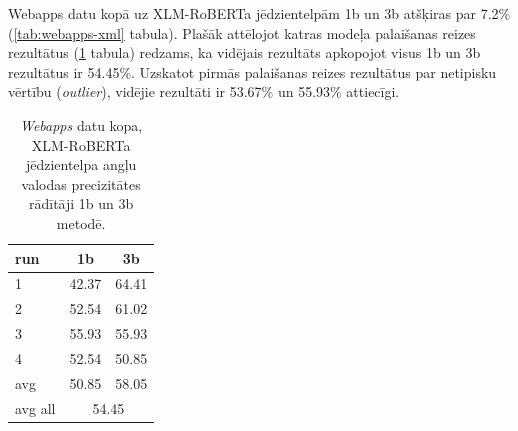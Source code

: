 Webapps datu kopā uz XLM-RoBERTa jēdzientelpām 1b un 3b atšķiras par 
7.2\% (\ref{tab:webapps-xml} tabula). Plašāk attēlojot katras modeļa palaišanas reizes rezultātus (\ref{tab:13b-webapps} tabula) redzams, ka vidējais rezultāts apkopojot visus 1b un 3b rezultātus ir 54.45\%. Uzskatot pirmās palaišanas reizes rezultātus par netipisku vērtību (\textit{outlier}), vidējie rezultāti ir 53.67\% un 55.93\% attiecīgi. 



\begin{table}[htbp]
  \centering
  \caption{\textit{Webapps} datu kopa, XLM-RoBERTa jēdzientelpa angļu valodas precizitātes rādītāji 1b un 3b metodē.}
    \begin{tabular}{lcc}\toprule
    run   & 1b & 3b \\\midrule
    1 & 42.37 & 64.41 \\
    2 & 52.54 & 61.02 \\
    3 & 55.93 & 55.93 \\
    4 & 52.54 & 50.85 \\\midrule
    avg   & 50.85 & 58.05 \\
    avg all & \multicolumn{2}{c}{54.45} \\\bottomrule
    \end{tabular}%
  \label{tab:13b-webapps}%
\end{table}%


